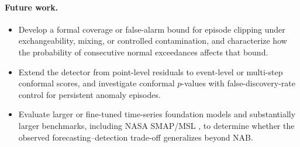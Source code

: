\documentclass[11pt]{article}
\theoremstyle{definition}
\theoremstyle{remark}
\begin{document}
\paragraph{Future work.}
\begin{itemize}[leftmargin=*,itemsep=2pt]
  \item Develop a formal coverage or false-alarm bound for episode clipping under exchangeability, mixing, or controlled contamination, and characterize how the probability of consecutive normal exceedances affects that bound.
  \item Extend the detector from point-level residuals to event-level or multi-step conformal scores, and investigate conformal $p$-values with false-discovery-rate control \cite{bates2023testing} for persistent anomaly episodes.
  \item Evaluate larger or fine-tuned time-series foundation models and substantially larger benchmarks, including NASA SMAP/MSL \cite{hundman2018detecting}, to determine whether the observed forecasting--detection trade-off generalizes beyond NAB.
\end{itemize}


{\small
\setlength{\bibsep}{2pt plus 1pt}
}
\end{document}
